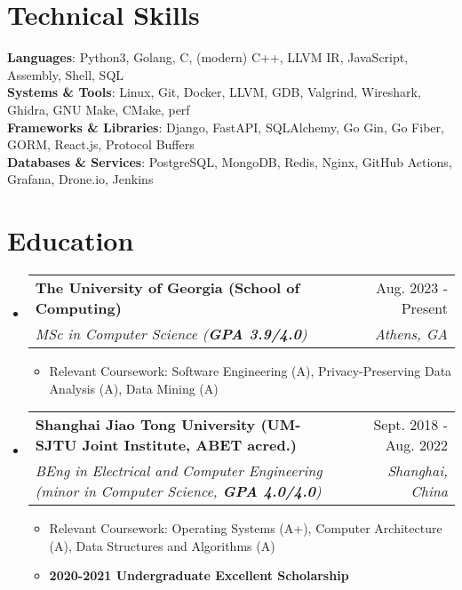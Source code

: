 \documentclass[letterpaper,11pt]{article}
\makeatletter
\newcommand{\resumeItem}[1]{
  \item\small{
    {#1 \vspace{-2pt}}
  }
}
\newcommand{\resumeSubHeader}[4]{
  \vspace{-2pt}\item
    \begin{tabular*}{0.98\textwidth}[t]{l@{\extracolsep{\fill}}r}
      \textbf{#1} & #2 \\
      \textit{\small#3} & \textit{\small #4} \\
    \end{tabular*}\vspace{-7pt}
}
\newcommand{\resumeSubHeaderListStart}{\begin{itemize}[leftmargin=0.15in, label={}]}
\newcommand{\resumeSubHeaderListEnd}{\end{itemize}}
\newcommand{\resumeItemListStart}{\begin{itemize}}
\newcommand{\resumeItemListEnd}{\end{itemize}\vspace{-5pt}}
\makeatother
\begin{document}
\section{Technical Skills}
 \begin{itemize}[leftmargin=0.15in, label={}]
    \small{
      \item{
     \textbf{Languages}{: Python3, Golang, C, (modern) C++, LLVM IR, JavaScript, Assembly, Shell, SQL} \\
     \textbf{Systems \& Tools}{: Linux, Git, Docker, LLVM, GDB, Valgrind, Wireshark, Ghidra, GNU Make, CMake, perf} \\
     \textbf{Frameworks \& Libraries}{: Django, FastAPI, SQLAlchemy, Go Gin, Go Fiber, GORM, React.js, Protocol Buffers} \\
     \textbf{Databases \& Services}{: PostgreSQL, MongoDB, Redis, Nginx, GitHub Actions, Grafana, Drone.io, Jenkins}
    }}
 \end{itemize}

\section{Education}
  \resumeSubHeaderListStart
    \resumeSubHeader
      {The University of Georgia (School of Computing)}{Aug. 2023 - Present}
      {MSc in Computer Science (\textbf{GPA 3.9/4.0})}{Athens, GA}
      \resumeItemListStart
        \resumeItem{Relevant Coursework: Software Engineering (A), Privacy-Preserving Data Analysis (A), Data Mining (A)}
      \resumeItemListEnd
    \resumeSubHeader
      {Shanghai Jiao Tong University (UM-SJTU Joint Institute, ABET acred.)}{Sept. 2018 - Aug. 2022}
      {BEng in Electrical and Computer Engineering (minor in Computer Science, \textbf{GPA 4.0/4.0})}{Shanghai, China}
      \resumeItemListStart
        \resumeItem{Relevant Coursework: Operating Systems (A+), Computer Architecture (A), Data Structures and Algorithms (A)}
        \resumeItem{\textbf{2020-2021 Undergraduate Excellent Scholarship}}
      \resumeItemListEnd
  \resumeSubHeaderListEnd
\end{document}
